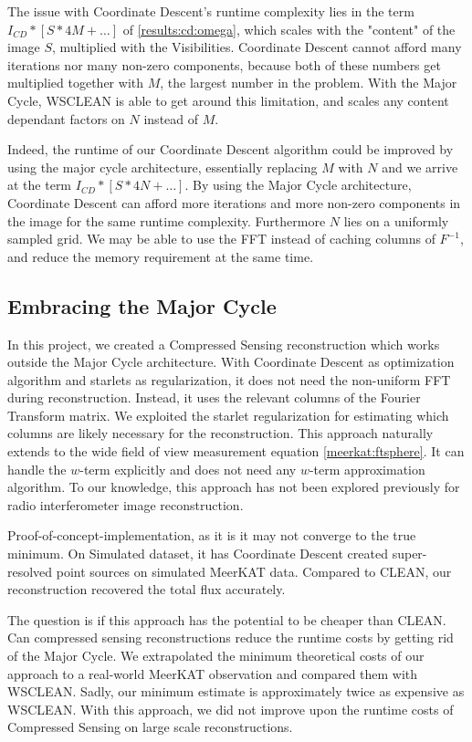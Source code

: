 The issue with Coordinate Descent's runtime complexity lies in the term $I_{CD} * [S * 4M +\ldots]$ of \eqref{results:cd:omega}, which scales with the "content" of the image $S$, multiplied with the Visibilities. Coordinate Descent cannot afford many iterations nor many non-zero components, because both of these numbers get multiplied together with $M$, the largest number in the problem. With the Major Cycle, WSCLEAN is able to get around this limitation, and scales any content dependant factors on $N$ instead of $M$. 

Indeed, the runtime of our Coordinate Descent algorithm could be improved by using the major cycle architecture, essentially replacing $M$ with $N$ and we arrive at the term $I_{CD} * [S * 4N +\ldots]$. By using the Major Cycle architecture, Coordinate Descent can afford more iterations and more non-zero components in the image for the same runtime complexity. Furthermore $N$ lies on a uniformly sampled grid. We may be able to use the FFT instead of caching columns of $F^{-1}$, and reduce the memory requirement at the same time.



\subsection{Embracing the Major Cycle}
In this project, we created a Compressed Sensing reconstruction which works outside the Major Cycle architecture. With Coordinate Descent as optimization algorithm and starlets as regularization, it does not need the non-uniform FFT during reconstruction. Instead, it uses the relevant columns of the Fourier Transform matrix.  We exploited the starlet regularization for estimating which columns are likely necessary for the reconstruction. This approach naturally extends to the wide field of view measurement equation \eqref{meerkat:ftsphere}. It can handle the $w$-term explicitly and does not need any $w$-term approximation algorithm. To our knowledge, this approach has not been explored previously for radio interferometer image reconstruction. 


Proof-of-concept-implementation, as it is it may not converge to the true minimum. 
On Simulated dataset, it has 
Coordinate Descent created super-resolved point sources on simulated MeerKAT data. Compared to CLEAN, our reconstruction recovered the total flux accurately.

The question is if this approach has the potential to be cheaper than CLEAN. Can compressed sensing reconstructions reduce the runtime costs by getting rid of the Major Cycle. We extrapolated the minimum theoretical costs of our approach to a real-world MeerKAT observation and compared them with WSCLEAN. Sadly, our minimum estimate is approximately twice as expensive as WSCLEAN. 
With this approach, we did not improve upon the runtime costs of Compressed Sensing on large scale reconstructions.

